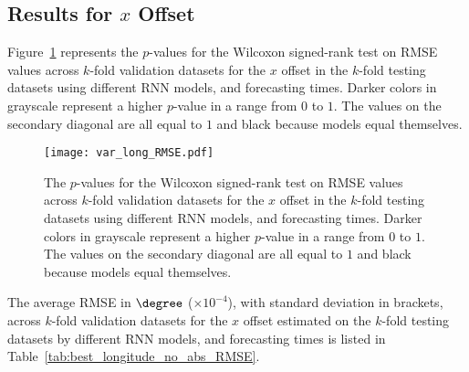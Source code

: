 \subsection{Results for $x$ Offset}

Figure~\ref{fig:var_long_RMSE} represents the $p$-values for the Wilcoxon signed-rank test on RMSE values across $k$-fold validation datasets for the $x$ offset in the $k$-fold testing datasets using different RNN models, and forecasting times. Darker colors in grayscale represent a higher $p$-value in a range from $0$ to $1$. The values on the secondary diagonal are all equal to $1$ and black because models equal themselves.

\begin{figure}[!ht]
	\centering
	\texttt{[image: var\_long\_RMSE.pdf]}
	\caption{The $p$-values for the Wilcoxon signed-rank test on RMSE values across $k$-fold validation datasets for the $x$ offset in the $k$-fold testing datasets using different RNN models, and forecasting times. Darker colors in grayscale represent a higher $p$-value in a range from $0$ to $1$. The values on the secondary diagonal are all equal to $1$ and black because models equal themselves.}
	\label{fig:var_long_RMSE}
\end{figure}

The average RMSE in $\degree$ ($\times 10^{-4}$), with standard deviation in brackets, across $k$-fold validation datasets for the $x$ offset estimated on the $k$-fold testing datasets by different RNN models, and forecasting times is listed in Table~\ref{tab:best_longitude_no_abs_RMSE}.


